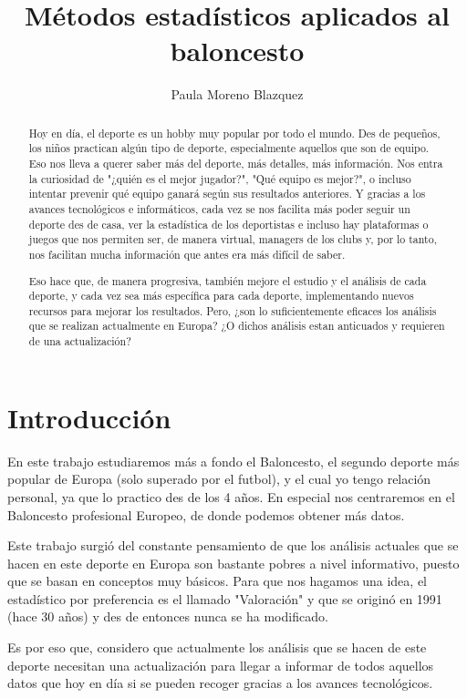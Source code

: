 \documentclass[paper=a4, fontsize=9pt]{article}
\title{Métodos estadísticos aplicados al baloncesto}
\author{Paula Moreno Blazquez}
\begin{document}


\maketitle

\clearpage

\begin{abstract}

Hoy en día, el deporte es un hobby muy popular por todo el mundo. Des de pequeños, los niños practican algún tipo de deporte, especialmente aquellos que son de equipo. Eso nos lleva a querer saber más del deporte, más detalles, más información. Nos entra la curiosidad de "¿quién es el mejor jugador?", "Qué equipo es mejor?", o incluso intentar prevenir qué equipo ganará según sus resultados anteriores. Y gracias a los avances tecnológicos e informáticos, cada vez se nos facilita más poder seguir un deporte des de casa, ver la estadística de los deportistas e incluso hay plataformas o juegos que nos permiten ser, de manera virtual, managers de los clubs y, por lo tanto, nos facilitan mucha información que antes era más difícil de saber.

Eso hace que, de manera progresiva, también mejore el estudio y el análisis de cada deporte, y cada vez sea más específica para cada deporte, implementando nuevos recursos para mejorar los resultados. Pero, ¿son lo suficientemente eficaces los análisis que se realizan actualmente en Europa? ¿O dichos análisis estan anticuados y requieren de una actualización?

\end{abstract}

\pagebreak            %
\newpage              %

\tableofcontents

\clearpage



\section{Introducción}

En este trabajo estudiaremos más a fondo el Baloncesto, el segundo deporte más popular de Europa (solo superado por el futbol), y el cual yo tengo relación personal, ya que lo practico des de los 4 años. En especial nos centraremos en el Baloncesto profesional Europeo, de donde podemos obtener más datos.

Este trabajo surgió del constante pensamiento de que los análisis actuales que se hacen en este deporte en Europa son bastante pobres a nivel informativo, puesto que se basan en conceptos muy básicos. Para que nos hagamos una idea, el estadístico por preferencia es el llamado "Valoración" y que se originó en 1991 (hace 30 años) y des de entonces nunca se ha modificado.

Es por eso que, considero que actualmente los análisis que se hacen de este deporte necesitan una actualización para llegar a informar de todos aquellos datos que hoy en día si se pueden recoger gracias a los avances tecnológicos.
\end{document}
